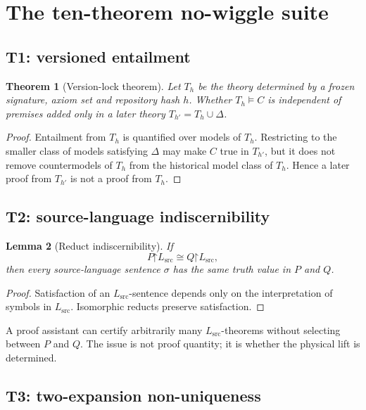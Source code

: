 \documentclass[10pt,a4paper]{article}
\newtheorem{theorem}{Theorem}[section]
\newtheorem{lemma}[theorem]{Lemma}
\theoremstyle{definition}
\theoremstyle{remark}
\newcommand{\Lsrc}{L_{\mathrm{src}}}
\newcommand{\restr}{\mathord{\upharpoonright}}
\begin{document}
\section{The ten-theorem no-wiggle suite}
\label{sec:theorems}

\subsection{T1: versioned entailment}

\begin{theorem}[Version-lock theorem]
Let \(T_h\) be the theory determined by a frozen signature, axiom set and
repository hash \(h\).  Whether \(T_h\models C\) is independent of premises
added only in a later theory \(T_{h'}=T_h\cup\Delta\).
\end{theorem}

\begin{proof}
Entailment from \(T_h\) is quantified over models of \(T_h\).  Restricting to
the smaller class of models satisfying \(\Delta\) may make \(C\) true in
\(T_{h'}\), but it does not remove countermodels of \(T_h\) from the historical
model class of \(T_h\).  Hence a later proof from \(T_{h'}\) is not a proof
from \(T_h\).
\end{proof}

\subsection{T2: source-language indiscernibility}

\begin{lemma}[Reduct indiscernibility]
If
\[
P\restr\Lsrc\cong Q\restr\Lsrc,
\]
then every source-language sentence \(\sigma\) has the same truth value in
\(P\) and \(Q\).
\end{lemma}

\begin{proof}
Satisfaction of an \(\Lsrc\)-sentence depends only on the interpretation of
symbols in \(\Lsrc\).  Isomorphic reducts preserve satisfaction.
\end{proof}

\begin{resultbox}[Consequence]
A proof assistant can certify arbitrarily many \(\Lsrc\)-theorems without
selecting between \(P\) and \(Q\).  The issue is not proof quantity; it is
whether the physical lift is determined.
\end{resultbox}

\subsection{T3: two-expansion non-uniqueness}
\end{document}
